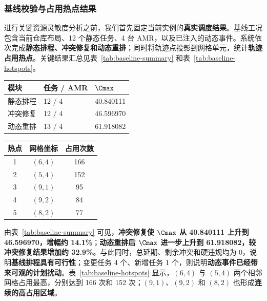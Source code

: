 \subsubsection{基线校验与占用热点结果}

进行关键资源灵敏度分析之前，我们首先固定当前实例的\textbf{真实调度结果}。基线工况包含当前仓库布局、12 个静态任务、4 台 AMR，以及已注入的动态事件。系统依次完成\textbf{静态排程、冲突修复和动态重排}；同时将轨迹点投影到网格单元，统计\textbf{轨迹占用热点}。关键结果汇总见表~\ref{tab:baseline-summary} 和表~\ref{tab:baseline-hotspots}。

\begin{center}
\begin{minipage}[t]{0.53\linewidth}
\centering
\small
{}
\label{tab:baseline-summary}
\renewcommand{\arraystretch}{1.76}
\begin{tabular}{@{}lll@{}}
\toprule
模块 & 任务 / AMR & $\Cmax$ \\
\midrule
静态排程 & 12 / 4 & 40.840111 \\
冲突修复 & 12 / 4 & 46.596970 \\
动态重排 & 13 / 4 & 61.918082 \\
\bottomrule
\end{tabular}
\renewcommand{\arraystretch}{1}
\end{minipage}
\hfill
\begin{minipage}[t]{0.39\linewidth}
\centering
\small
{}
\label{tab:baseline-hotspots}
\begin{tabular}{@{}ccc@{}}
\toprule
热点 & 网格坐标 & 占用次数 \\
\midrule
1 & $(6,4)$ & 166 \\
2 & $(5,4)$ & 152 \\
3 & $(9,1)$ & 95 \\
4 & $(9,2)$ & 84 \\
5 & $(8,2)$ & 77 \\
\bottomrule
\end{tabular}
\end{minipage}
\end{center}

由表~\ref{tab:baseline-summary} 可见，\textbf{冲突修复使 $\Cmax$ 从 40.840111 上升到 46.596970，增幅约 14.1\%}；\textbf{动态重排后 $\Cmax$ 进一步上升到 61.918082，较冲突修复结果增加约 32.9\%}。与此同时，总延期、剩余冲突和硬违规均为 0，说明\textbf{基线排程具有可行性}；变更任务 4 个、新增任务 1 个，则说明\textbf{动态事件已经带来可观的计划扰动}。表~\ref{tab:baseline-hotspots} 显示，$(6,4)$ 与 $(5,4)$ 两个相邻网格占用最高，分别达到 166 次和 152 次；$(9,1)$、$(9,2)$ 和 $(8,2)$ 也形成\textbf{连续的高占用区域}。

